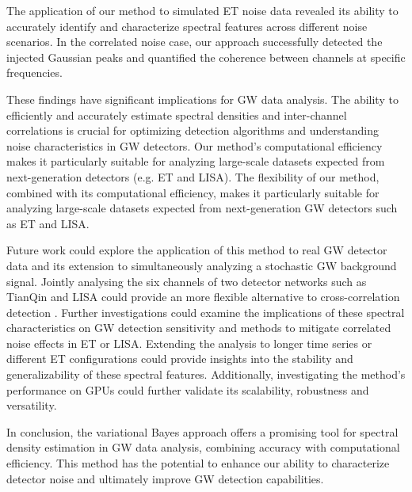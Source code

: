 \documentclass[%
 reprint,
 amsmath,amssymb,
 aps,
 nofootinbib,
]{revtex4-2}
\begin{document}
The application of our method to simulated ET noise data revealed its ability to accurately identify and characterize spectral features across different noise scenarios.
In the correlated noise case, our approach successfully detected the injected Gaussian peaks and quantified the coherence between channels at specific frequencies. 


These findings have significant implications for GW data analysis. The ability to efficiently and accurately estimate spectral densities and inter-channel correlations is crucial for optimizing detection algorithms and understanding noise characteristics in GW detectors. Our method's computational efficiency makes it particularly suitable for analyzing large-scale datasets expected from next-generation detectors (e.g. ET and LISA). The flexibility of our method, combined with its computational efficiency, makes it particularly suitable for analyzing large-scale datasets expected from next-generation GW detectors such as ET and LISA.

Future work could explore the application of this method to real GW detector data and its extension to simultaneously analyzing a stochastic GW background signal. Jointly analysing the six channels of two detector networks such as TianQin and LISA could provide an more flexible alternative to cross-correlation detection  \cite{liang2024}.
Further investigations could examine the implications of these spectral characteristics on GW detection sensitivity and methods to mitigate correlated noise effects in ET or LISA. Extending the analysis to longer time series or different ET configurations could provide insights into the stability and generalizability of these spectral features.
Additionally, investigating the method's performance on GPUs could further validate its scalability, robustness and versatility.

In conclusion, the variational Bayes approach offers a promising tool for spectral density estimation in GW data analysis, combining accuracy with computational efficiency. This method has the potential to enhance our ability to characterize detector noise and ultimately improve GW detection capabilities.



\end{document}
